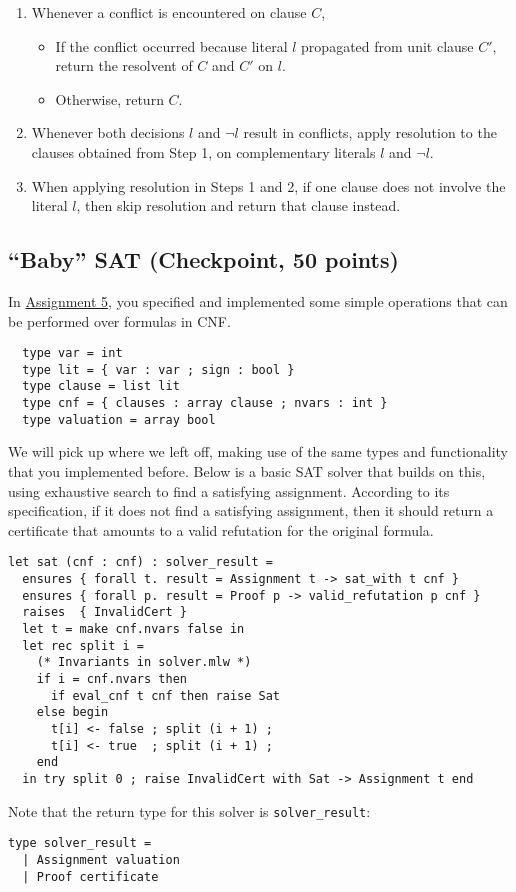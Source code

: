 \documentclass[11pt]{article}
\begin{document}
\begin{enumerate}[itemsep=1pt,topsep=1pt,partopsep=10pt,parsep=1pt]
  \item Whenever a conflict is encountered on clause $C$,
    \begin{itemize}[itemsep=1pt,topsep=1pt,partopsep=1pt,parsep=1pt]
    \item If the conflict occurred because literal $l$ propagated from unit clause $C'$, return the resolvent of $C$ and $C'$ on $l$.
    \item Otherwise, return $C$.
    \end{itemize}
  \item Whenever both decisions $l$ and $\lnot l$ result in conflicts, apply resolution to the clauses obtained from Step 1, on complementary literals $l$ and $\lnot l$.
  \item When applying resolution in Steps 1 and 2, if one clause does not involve the literal $l$, then skip resolution and return that clause instead.
\end{enumerate}

\clearpage

\subsection{``Baby'' SAT (Checkpoint, 50 points)}

In \href{https://www.cs.cmu.edu/~15414/assignments/asst5.pdf}{Assignment 5}, you specified and implemented some simple operations that can be performed over formulas in CNF.
\begin{lstlisting}
  type var = int
  type lit = { var : var ; sign : bool }
  type clause = list lit
  type cnf = { clauses : array clause ; nvars : int }
  type valuation = array bool
\end{lstlisting}
We will pick up where we left off, making use of the same types and functionality that you implemented before.
Below is a basic SAT solver that builds on this, using exhaustive search to find a satisfying assignment.
According to its specification, if it does not find a satisfying assignment, then it should return a certificate that amounts to a valid refutation for the original formula.
\begin{lstlisting}
let sat (cnf : cnf) : solver_result =
  ensures { forall t. result = Assignment t -> sat_with t cnf }
  ensures { forall p. result = Proof p -> valid_refutation p cnf }
  raises  { InvalidCert }
  let t = make cnf.nvars false in
  let rec split i =
    (* Invariants in solver.mlw *)
    if i = cnf.nvars then
      if eval_cnf t cnf then raise Sat
    else begin
      t[i] <- false ; split (i + 1) ;
      t[i] <- true  ; split (i + 1) ;
    end
  in try split 0 ; raise InvalidCert with Sat -> Assignment t end
\end{lstlisting}
Note that the return type for this solver is \verb'solver_result':
\begin{lstlisting}
type solver_result =
  | Assignment valuation
  | Proof certificate
\end{lstlisting}
\end{document}
